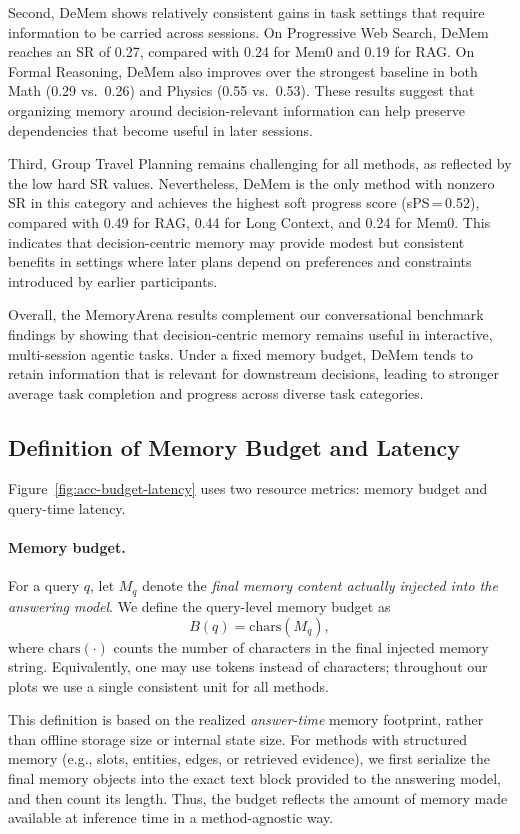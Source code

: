 \documentclass{article}
\theoremstyle{plain}
\theoremstyle{definition}
\theoremstyle{remark}
\begin{document}
Second, DeMem shows relatively consistent gains in task settings that require information to be carried across sessions. On Progressive Web Search, DeMem reaches an SR of 0.27, compared with 0.24 for Mem0 and 0.19 for RAG. On Formal Reasoning, DeMem also improves over the strongest baseline in both Math (0.29 vs.\ 0.26) and Physics (0.55 vs.\ 0.53). These results suggest that organizing memory around decision-relevant information can help preserve dependencies that become useful in later sessions.

Third, Group Travel Planning remains challenging for all methods, as reflected by the low hard SR values. Nevertheless, DeMem is the only method with nonzero SR in this category and achieves the highest soft progress score (sPS\,=\,0.52), compared with 0.49 for RAG, 0.44 for Long Context, and 0.24 for Mem0. This indicates that decision-centric memory may provide modest but consistent benefits in settings where later plans depend on preferences and constraints introduced by earlier participants.

Overall, the MemoryArena results complement our conversational benchmark findings by showing that decision-centric memory remains useful in interactive, multi-session agentic tasks. Under a fixed memory budget, DeMem tends to retain information that is relevant for downstream decisions, leading to stronger average task completion and progress across diverse task categories.

\subsection{Definition of Memory Budget and Latency}
\label{app:budget-latency}

Figure~\ref{fig:acc-budget-latency} uses two resource metrics: memory budget and query-time latency.

\paragraph{Memory budget.}
For a query $q$, let $M_q$ denote the \emph{final memory content actually injected into the answering model}. 
We define the query-level memory budget as
\[
B(q) = \mathrm{chars}(M_q),
\]
where $\mathrm{chars}(\cdot)$ counts the number of characters in the final injected memory string. 
Equivalently, one may use tokens instead of characters; throughout our plots we use a single consistent unit for all methods.

This definition is based on the realized \emph{answer-time} memory footprint, rather than offline storage size or internal state size. 
For methods with structured memory (e.g., slots, entities, edges, or retrieved evidence), we first serialize the final memory objects into the exact text block provided to the answering model, and then count its length. 
Thus, the budget reflects the amount of memory made available at inference time in a method-agnostic way.
\end{document}
